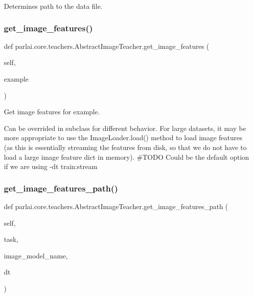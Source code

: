 \begin{DoxyVerb}Determines path to the data file.
\end{DoxyVerb}
 \mbox{\label{classparlai_1_1core_1_1teachers_1_1AbstractImageTeacher_a3e1f85a8de230d8733272bd1e860cd92}} 
\subsubsection{\texorpdfstring{get\+\_\+image\+\_\+features()}{get\_image\_features()}}
{\footnotesize\ttfamily def parlai.\+core.\+teachers.\+Abstract\+Image\+Teacher.\+get\+\_\+image\+\_\+features (\begin{DoxyParamCaption}\item[{}]{self,  }\item[{}]{example }\end{DoxyParamCaption})}

\begin{DoxyVerb}Get image features for example.

Can be overrided in subclass for different behavior. For large datasets, it may
be more appropriate to use the ImageLoader.load() method to load image features
(as this is essentially streaming the features from disk, so that we do not have
to load a large image feature dict in memory). #TODO Could be the default option
if we are using -dt train:stream
\end{DoxyVerb}
 \mbox{\label{classparlai_1_1core_1_1teachers_1_1AbstractImageTeacher_a29fce019ea9795947235ba208aa4bfb0}} 
\subsubsection{\texorpdfstring{get\+\_\+image\+\_\+features\+\_\+path()}{get\_image\_features\_path()}}
{\footnotesize\ttfamily def parlai.\+core.\+teachers.\+Abstract\+Image\+Teacher.\+get\+\_\+image\+\_\+features\+\_\+path (\begin{DoxyParamCaption}\item[{}]{self,  }\item[{}]{task,  }\item[{}]{image\+\_\+model\+\_\+name,  }\item[{}]{dt }\end{DoxyParamCaption})}


